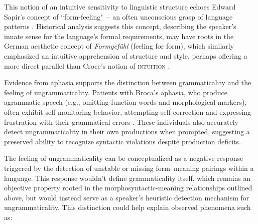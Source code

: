 This notion of an intuitive sensitivity to linguistic structure echoes Edward Sapir's concept of ``form-feeling"~-- an often unconscious grasp of language patterns \autocite{Sapir1921, Sapir1927b}. Historical analysis suggests this concept, describing the speaker's innate sense for the language's formal requirements, may have roots in the German aesthetic concept of \textit{Formgefühl} (feeling for form), which similarly emphasized an intuitive apprehension of structure and style, perhaps offering a more direct parallel than Croce's notion of \textsc{intuition} \autocite{Fortis2014, Lipps1897}.

Evidence from aphasia supports the distinction between grammaticality and the feeling of ungrammaticality. Patients with Broca's aphasia, who produce agrammatic speech (e.g., omitting function words and morphological markers), often exhibit self-monitoring behavior, attempting self-correction and expressing frustration with their grammatical errors \autocite{oomen2005}. These individuals also accurately detect ungrammaticality in their own productions when prompted, suggesting a preserved ability to recognize syntactic violations despite production deficits.

The feeling of ungrammaticality can be conceptualized as a negative response triggered by the detection of unstable or missing form--meaning pairings within a language. This response wouldn't define grammaticality itself, which remains an objective property rooted in the morphosyntactic-meaning relationships outlined above, but would instead serve as a speaker's heuristic detection mechanism for ungrammaticality. This distinction could help explain observed phenomena such as:

